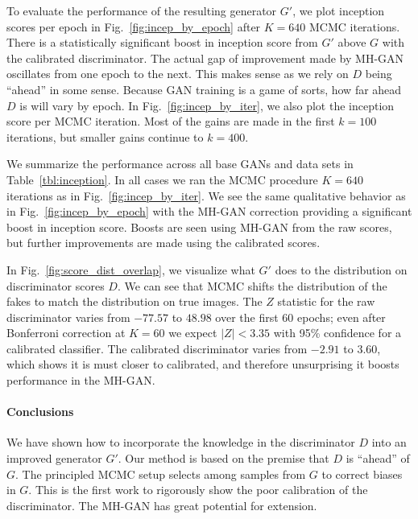 \documentclass{article}
\begin{document}
To evaluate the performance of the resulting generator $G'$, we plot inception scores per epoch in Fig.~\ref{fig:incep_by_epoch} after $K=640$ MCMC iterations.
There is a statistically significant boost in inception score from $G'$ above $G$ with the calibrated discriminator.
The actual gap of improvement made by MH-GAN oscillates from one epoch to the next.
This makes sense as we rely on $D$ being ``ahead'' in some sense.
Because GAN training is a game of sorts, how far ahead $D$ is will vary by epoch.
In Fig.~\ref{fig:incep_by_iter}, we also plot the inception score per MCMC iteration.
Most of the gains are made in the first $k=100$ iterations, but smaller gains continue to $k=400$.

We summarize the performance across all base GANs and data sets in Table~\ref{tbl:inception}.
In all cases we ran the MCMC procedure $K=640$ iterations as in Fig.~\ref{fig:incep_by_iter}.
We see the same qualitative behavior as in Fig.~\ref{fig:incep_by_epoch} with the MH-GAN correction providing a significant boost in inception score.
Boosts are seen using MH-GAN from the raw scores, but further improvements are made using the calibrated scores.

In Fig.~\ref{fig:score_dist_overlap}, we visualize what $G'$ does to the distribution on discriminator scores $D$.
We can see that MCMC shifts the distribution of the fakes to match the distribution on true images.
The $Z$ statistic for the raw discriminator varies from $-77.57$ to $48.98$ over the first 60 epochs; even after Bonferroni correction at $K=60$ we expect $|Z| < 3.35$ with 95\% confidence for a calibrated classifier.
The calibrated discriminator varies from $-2.91$ to $3.60$, which shows it is must closer to calibrated, and therefore unsurprising it boosts performance in the MH-GAN\@.

\paragraph{Conclusions}
We have shown how to incorporate the knowledge in the discriminator $D$ into an improved generator $G'$.
Our method is based on the premise that $D$ is ``ahead'' of $G$.
The principled MCMC setup selects among samples from $G$ to correct biases in $G$.
This is the first work to rigorously show the poor calibration of the discriminator.
The MH-GAN has great potential for extension.  %


\end{document}
